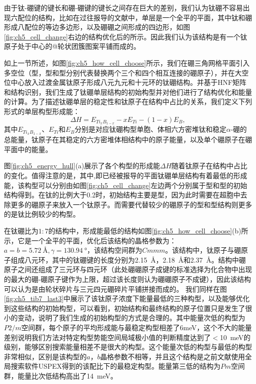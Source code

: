 由于钛-硼键的键长和硼-硼键的键长之间存在巨大的差别，我们认为钛硼不容易出现六配位的结构，比如在过往报导的文献中，单层是一个全平的平面，其中钛和硼形成八配位的等边多边形，以及硼硼之间形成的四边形，如图\ref{fig:ch5_cell_change}右边的结构优化后的所示。因此我们认为该结构是有一个钛原子处于中心的@轮状团簇图案平铺而成的。

如上一节所述，如图\ref{fig:ch5_how_cell_choose}所示，我们在硼三角网格平面引入多空位（型，型和型分别代表替换两个三个和四个相互连接的硼原子），并在大空位中心放入过渡金属钛原子形成八元九元和十元环的钛硼结构。并基于HNF矩阵和结构识别，我们生成了钛硼单层结构的初始构型并对他们进行了结构优化和能量的计算。为了描述钛硼单层的稳定性和钛原子在结构中占比的关系，我们定义下列形式的单层构型形成能：
\begin{equation}
  \Delta H = E_{Ti_xB_{1-x}} - xE_{Ti} - (1-x)E_{B},
\end{equation}
其中$E_{Ti_xB_{1-x}}$、$E_{Ti}$和$E_B$分别是对应钛硼构型单胞、体相六方密堆钛和稳定$\alpha$-硼的总能量，钛原子在其稳定的六方密堆体相结构中的原子能量，以及单个硼原子在硼平面中的能量。

图\ref{fig:ch5_energy_hull}(a)展示了各个构型的形成能$\Delta H$随着钛原子在结构中占比的变化。值得注意的是，其中,即已经被报导的平面钛硼单层结构有着最低的形成能，该构型可以分别由如图\ref{fig:ch5_cell_change}左边两个分别属于型和型的初始结构得到。在钛的比例大于\num{0.2}时，初始结构主要是型，因为此时需要在超胞中去除更多的硼原子来放入一个钛原子。而需要代替较少的硼原子的型和型结构则更多的是钛比例较少的构型。

在钛硼比为$1:7$的结构中，形成能最低的结构如图\ref{fig:ch5_how_cell_choose}(b)所示，它是一个全平的平面，优化后该结构的晶格参数为：$a=b=\SI{5.72}{\angstrom},\gamma=\SI{130.94}{\degree}$，该结构空间群为$Cmmm$。该结构中，钛原子与硼原子组成八元环，其中的钛硼键的长度分别为\SI{2.15}{\angstrom}，\SI{2.18}{\angstrom}和\SI{2.37}{\angstrom}。结构中硼原子之间还组成了三元环与四元环（此处硼硼原子成键的标准选择为化合物中出现的最大的硼-硼原子键作为上限，超过该长度则认为硼硼原子不成键），因此该结构可以认为是由轮状碎片与三元四元硼碎片平铺拼接而成的。
我们同样在图\ref{fig:ch5_tib7_last3}中展示了该钛原子浓度下能量最低的三种构型，以及能够优化到这些结构的初始构型，可以看到，初始结构和最终结构的原子位置只是发生了很小的变动，说明了我们生成的初始构型的方式是合理的。其中能量次低的构型为$P2/m$空间群，每个原子的平均形成能与最稳定构型相差了6meV，这个不大的能量差别说明我们方法对特定构型势能空间局域极小值的判断精度达到了$<$\SI{10}{\meV}的级别，能够区别搜索能量相差不是很大的构型。这个能量次低的构型与最低的构型非常相似，区别是该构型的$a，b$晶格参数不相等，并且这个结构是之前文献\cite{wang2017semimetallic}使用全局搜索软件USPEX得到的该配比下的最稳定构型。能量第三低的结构为$Pm$空间群，能量比次低结构高出了\SI{14}{\meV}。

